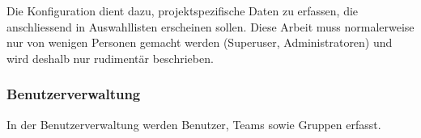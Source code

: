 Die Konfiguration dient dazu, projektspezifische Daten zu erfassen, die anschliessend in Auswahllisten erscheinen sollen. Diese Arbeit muss normalerweise nur von wenigen Personen gemacht werden (Superuser, Administratoren) und wird deshalb nur rudimentär beschrieben.

\subsubsection{Benutzerverwaltung}

In der Benutzerverwaltung werden Benutzer, Teams sowie Gruppen erfasst.

